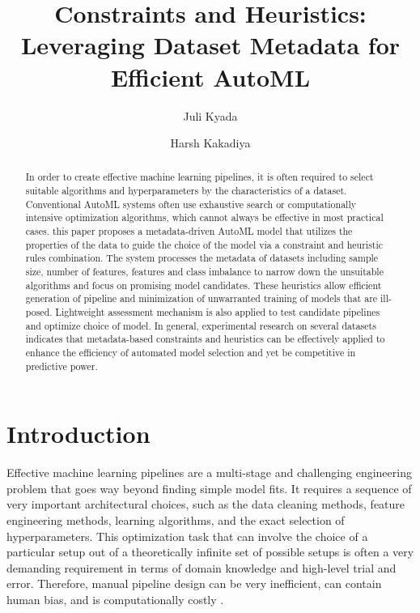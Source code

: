 \documentclass[conference]{llncs}
\title{Constraints and Heuristics: Leveraging Dataset Metadata for Efficient AutoML}
\author{Juli Kyada \and Harsh Kakadiya}
\institute{Charotar University of Science and Technology, Changa, India\\
\email{julikyada293@gmail.com, harshkakadiya128@gmail.com}
}
\begin{document}
   \maketitle

   \begin{abstract}
In order to create effective machine learning pipelines, it is often required to select suitable algorithms and hyperparameters by the characteristics of a dataset. Conventional AutoML systems often use exhaustive search or computationally intensive optimization algorithms, which cannot always be effective in most practical cases. this paper proposes a metadata-driven AutoML model that utilizes the properties of the data to guide the choice of the model via a constraint and heuristic rules combination. The system processes the metadata of datasets including sample size, number of features, features and class imbalance to narrow down the unsuitable algorithms and focus on promising model candidates. These heuristics allow efficient generation of pipeline and minimization of unwarranted training of models that are ill-posed. Lightweight assessment mechanism is also applied to test candidate pipelines and optimize choice of model. In general, experimental research on several datasets indicates that metadata-based constraints and heuristics can be effectively applied to enhance the efficiency of automated model selection and yet be competitive in predictive power.

\end{abstract}

  

   \section{Introduction}
   

    Effective machine learning pipelines are a multi-stage and challenging engineering problem that goes way beyond finding simple model fits. It requires a sequence of very important architectural choices, such as the data cleaning methods, feature engineering methods, learning algorithms, and the exact selection of hyperparameters. This optimization task that can involve the choice of a particular setup out of a theoretically infinite set of possible setups is often a very demanding requirement in terms of domain knowledge and high-level trial and error. Therefore, manual pipeline design can be very inefficient, can contain human bias, and is computationally costly \cite{michie1994machine}. 
   
\end{document}
